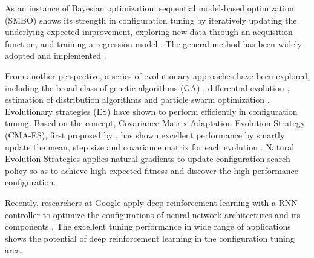As an instance of Bayesian optimization, sequential model-based optimization (SMBO) shows its strength in configuration tuning by iteratively updating the underlying expected improvement, exploring new data through an acquisition function, and training a regression model \cite{hutter2011sequential,bergstra2011algorithms,hoffman2014modular}. The general method has been widely adopted and implemented  \cite{kandasamy2018neural,snoek2012practical}.


From another perspective, a series of evolutionary approaches have been explored, including the broad class of genetic algorithms (GA) \cite{Holland1975,Goldberg1989}, differential evolution \cite{Storn1997}, estimation of distribution algorithms \cite{larranaga2001estimation,bosman2007adapted} and particle swarm optimization \cite{kennedy2001swarm}.  Evolutionary strategies (ES) \cite{rechenberg1994evolutionsstrategie,schwefel1977numerische} have shown to perform efficiently in configuration tuning. Based on the concept, Covariance Matrix Adaptation Evolution Strategy (CMA-ES), first proposed by \cite{hansen2001completely}, has shown excellent performance by smartly update the mean, step size and covariance matrix for each evolution \cite{LoshchilovH16} . Natural Evolution Strategies \cite{wierstra2014natural} applies natural gradients to update configuration search policy so as to achieve high expected fitness and discover the high-performance configuration.


Recently, researchers at Google apply deep reinforcement learning with a RNN controller to optimize the configurations of neural network architectures and its components \cite{bello2017neural,mirhoseini2017device,ramachandran2018searching,zoph2016neural,pham2018efficient}. The excellent tuning performance in wide range of applications shows the potential of deep reinforcement learning in the configuration tuning area. 
